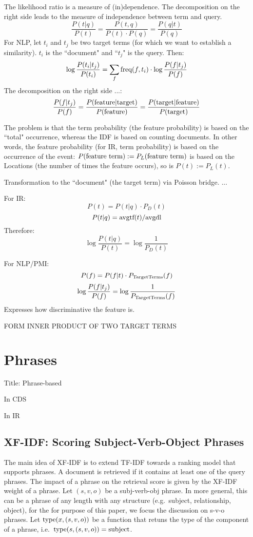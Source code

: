 The likelihood ratio is a measure of (in)dependence.
The decomposition on the right side leads to the measure of independence
between term and query.
\[
\frac{P(t|q)}{P(t)} = \frac{P(t,q)}{P(t) \cdot P(q)} = \frac{P(q|t)}{P(q)}
\]
For NLP, let $t_i$ and $t_j$ be two target terms
(for which we want to establish a similarity).
$t_i$ is the ``document" and ``$t_j$" is the query.
Then:
\[
\log\frac{P(t_i|t_j)}{P(t_i)} =
	\sum_f \textmd{freq}(f,t_i) \cdot \log\frac{P(f|t_j)}{P(f)}
\]
The decomposition on the right side ...:
\[
\frac{P(f|t_j)}{P(f)} =
\frac{P(\textmd{feature}|\textmd{target})}{P(\textmd{feature})} =
\frac{P(\textmd{target}|\textmd{feature})}{P(\textmd{target})}
\]

The problem is that the term probability (the feature probability)
is based on the ``total" occurrence, whereas the IDF is based
on counting documents.
In other words,
the feature probability (for IR, term probability) is based on
the occurrence of the event:
$P(\textmd{feature term}):=P_L(\textmd{feature term})$
is based on the Locations (the number of times the feature occurs), so is
$P(t):=P_L(t)$.

Transformation to the ``document" (the target term) via Poisson bridge.
...

For IR:
\[
P(t) = P(t|q) \cdot P_D(t)
\]
\[
P(t|q) = \textmd{avgtf}(t) / \textmd{avgdl}
\]
Therefore:
\[
\log\frac{P(t|q)}{P(t)} = \log\frac{1}{P_D(t)}
\]

For NLP/PMI:
\[
P(f) = P(f|t) \cdot P_\textmd{TargetTerms}(f)
\]
\[
\log\frac{P(f|t_j)}{P(f)} = \log\frac{1}{P_\textmd{TargetTerms}(f)}
\]
Expresses how discriminative the feature is.


FORM INNER PRODUCT OF TWO TARGET TERMS


\section{Phrases}

Title: Phrase-based


In CDS


In IR


\subsection{XF-IDF: Scoring Subject-Verb-Object Phrases}

The main idea of XF-IDF \cite{Azzam/etal:SIGMOD:KEYS:2010} is to extend
TF-IDF towards a ranking model that supports phrases.
%
A document is retrieved if it contains at least one of the query phrases.
%
The impact of a phrase on the retrieval score is given by the XF-IDF
weight of a phrase.
%
Let $(s,v,o)$ be a subj-verb-obj phrase.
In more general, this can be a phrase of any length with any structure
(e.g.~subject, relationship, object), for the for purpose of this paper,
we focus the discussion on s-v-o phrases.
%
Let $\textmd{type}(x,(s,v,o))$ be a function that retuns the type of the component
of a phrase, i.e.~$\textmd{type}(s,(s,v,o))=\textmd{subject}$.

